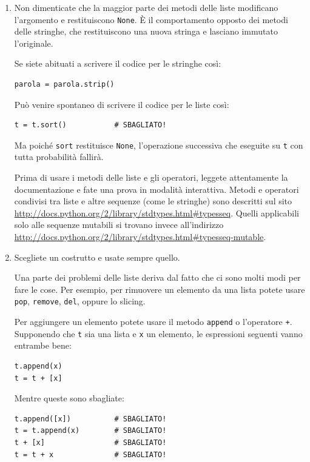 \documentclass[10pt]{book}
\begin{document}
\begin{enumerate}

\item Non dimenticate che la maggior parte dei metodi delle liste modificano l'argomento e restituiscono {\tt None}.  È il comportamento opposto dei metodi delle stringhe, che restituiscono una nuova stringa e lasciano immutato l'originale.

Se siete abituati a scrivere il codice per le stringhe così:

\begin{verbatim}
parola = parola.strip()
\end{verbatim}

Può venire spontaneo di scrivere il codice per le liste così:

\begin{verbatim}
t = t.sort()           # SBAGLIATO!
\end{verbatim}

Ma poiché {\tt sort} restituisce {\tt None}, l'operazione successiva che eseguite su {\tt t} con tutta probabilità fallirà.

Prima di usare i metodi delle liste e gli operatori, leggete attentamente la documentazione e fate una prova in modalità interattiva. Metodi e operatori condivisi tra liste e altre sequenze (come le stringhe) sono descritti sul sito
\url{http://docs.python.org/2/library/stdtypes.html#typesseq}.  Quelli applicabili solo alle sequenze mutabili si trovano invece all'indirizzo \url{http://docs.python.org/2/library/stdtypes.html#typesseq-mutable}.


\item Scegliete un costrutto e usate sempre quello.

Una parte dei problemi delle liste deriva dal fatto che ci sono molti modi per fare le cose. Per esempio, per rimuovere un elemento da una lista potete usare {\tt pop}, {\tt remove}, {\tt del}, oppure lo slicing.

Per aggiungere un elemento potete usare il metodo {\tt append} o l'operatore {\tt +}. Supponendo che {\tt t} sia una lista e {\tt x} un elemento, le espressioni seguenti vanno entrambe bene:

\begin{verbatim}
t.append(x)
t = t + [x]
\end{verbatim}

Mentre queste sono sbagliate:

\begin{verbatim}
t.append([x])          # SBAGLIATO!
t = t.append(x)        # SBAGLIATO!
t + [x]                # SBAGLIATO!
t = t + x              # SBAGLIATO!
\end{verbatim}


\end{enumerate}
\end{document}
